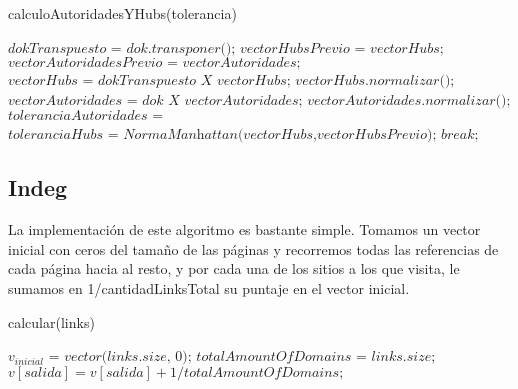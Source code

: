 \begin{algorithm}
\caption{calculoAutoridadesYHubs(tolerancia)}\label{euclid}
\begin{algorithmic}[1]
	\State $\textit{dokTranspuesto = dok.transponer();}$
	\State $\textit{vectorHubsPrevio = vectorHubs;}$
	\State $\textit{vectorAutoridadesPrevio = vectorAutoridades;}$
	\State $\textit{vectorHubs = dokTranspuesto X vectorHubs;}$
	\State $\textit{vectorHubs.normalizar();}$
	\State $\textit{vectorAutoridades = dok X vectorAutoridades;}$
	\State $\textit{vectorAutoridades.normalizar();}$
	\State $\textit{toleranciaAutoridades = NormaManhattan(vectorAutoridades,vectorAutoridadesPrevio);}$
	\State $\textit{toleranciaHubs = NormaManhattan(vectorHubs,vectorHubsPrevio);}$
		\State $\textit{break;}$
	\EndIf
\EndFor
\end{algorithmic}
\end{algorithm}

\subsection{Indeg}

La implementación de este algoritmo es bastante simple. Tomamos un vector inicial con ceros del tamaño de las páginas y recorremos todas las referencias de cada página hacia al resto, y por cada una de los sitios a los que visita, le sumamos en 1/cantidadLinksTotal su puntaje en el vector inicial.

\begin{algorithm}
\caption{calcular(links)}\label{euclid}
\begin{algorithmic}[1]
\State $\textit{$v_{inicial}$ = vector(links.size, 0);}$ 
\State $\textit{$totalAmountOfDomains$ = links.size;}$ 
			\State $\textit{$v[salida] = v[salida] + 1/totalAmountOfDomains;$}$ 
		\EndFor
	\EndIf
\EndFor
\end{algorithmic}
\end{algorithm}
